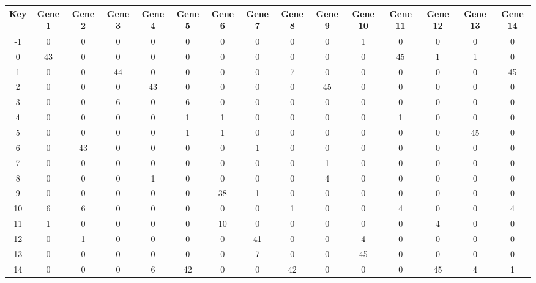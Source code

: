 \begin{tabular}{|c|c|c|c|c|c|c|c|c|c|c|c|c|c|c|}
\hline
Key & Gene 1 & Gene 2 & Gene 3 & Gene 4 & Gene 5 & Gene 6 & Gene 7 & Gene 8 & Gene 9 & Gene 10 & Gene 11 & Gene 12 & Gene 13 & Gene 14 \\
\hline
-1 & 0 & 0 & 0 & 0 & 0 & 0 & 0 & 0 & 0 & 1 & 0 & 0 & 0 & 0 \\
0 & 43 & 0 & 0 & 0 & 0 & 0 & 0 & 0 & 0 & 0 & 45 & 1 & 1 & 0 \\
1 & 0 & 0 & 44 & 0 & 0 & 0 & 0 & 7 & 0 & 0 & 0 & 0 & 0 & 45 \\
2 & 0 & 0 & 0 & 43 & 0 & 0 & 0 & 0 & 45 & 0 & 0 & 0 & 0 & 0 \\
3 & 0 & 0 & 6 & 0 & 6 & 0 & 0 & 0 & 0 & 0 & 0 & 0 & 0 & 0 \\
4 & 0 & 0 & 0 & 0 & 1 & 1 & 0 & 0 & 0 & 0 & 1 & 0 & 0 & 0 \\
5 & 0 & 0 & 0 & 0 & 1 & 1 & 0 & 0 & 0 & 0 & 0 & 0 & 45 & 0 \\
6 & 0 & 43 & 0 & 0 & 0 & 0 & 1 & 0 & 0 & 0 & 0 & 0 & 0 & 0 \\
7 & 0 & 0 & 0 & 0 & 0 & 0 & 0 & 0 & 1 & 0 & 0 & 0 & 0 & 0 \\
8 & 0 & 0 & 0 & 1 & 0 & 0 & 0 & 0 & 4 & 0 & 0 & 0 & 0 & 0 \\
9 & 0 & 0 & 0 & 0 & 0 & 38 & 1 & 0 & 0 & 0 & 0 & 0 & 0 & 0 \\
10 & 6 & 6 & 0 & 0 & 0 & 0 & 0 & 1 & 0 & 0 & 4 & 0 & 0 & 4 \\
11 & 1 & 0 & 0 & 0 & 0 & 10 & 0 & 0 & 0 & 0 & 0 & 4 & 0 & 0 \\
12 & 0 & 1 & 0 & 0 & 0 & 0 & 41 & 0 & 0 & 4 & 0 & 0 & 0 & 0 \\
13 & 0 & 0 & 0 & 0 & 0 & 0 & 7 & 0 & 0 & 45 & 0 & 0 & 0 & 0 \\
14 & 0 & 0 & 0 & 6 & 42 & 0 & 0 & 42 & 0 & 0 & 0 & 45 & 4 & 1 \\
\hline
\end{tabular}
